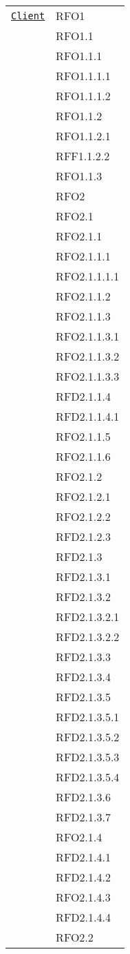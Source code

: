 \begin{longtable}{|>{\centering}m{10cm}|m{3cm}<{\centering}|}
\hyperref[Client]{\texttt{Client}} & RFO1\\
& RFO1.1\\
& RFO1.1.1\\
& RFO1.1.1.1\\
& RFO1.1.1.2\\
& RFO1.1.2\\
& RFO1.1.2.1\\
& RFF1.1.2.2\\
& RFO1.1.3\\
& RFO2\\
& RFO2.1\\
& RFO2.1.1\\
& RFO2.1.1.1\\
& RFO2.1.1.1.1\\
& RFO2.1.1.2\\
& RFO2.1.1.3\\
& RFO2.1.1.3.1\\
& RFO2.1.1.3.2\\
& RFO2.1.1.3.3\\
& RFD2.1.1.4\\
& RFD2.1.1.4.1\\
& RFO2.1.1.5\\
& RFO2.1.1.6\\
& RFO2.1.2\\
& RFO2.1.2.1\\
& RFO2.1.2.2\\
& RFD2.1.2.3\\
& RFD2.1.3\\
& RFD2.1.3.1\\
& RFD2.1.3.2\\
& RFD2.1.3.2.1\\
& RFD2.1.3.2.2\\
& RFD2.1.3.3\\
& RFD2.1.3.4\\
& RFD2.1.3.5\\
& RFD2.1.3.5.1\\
& RFD2.1.3.5.2\\
& RFD2.1.3.5.3\\
& RFD2.1.3.5.4\\
& RFD2.1.3.6\\
& RFD2.1.3.7\\
& RFO2.1.4\\
& RFD2.1.4.1\\
& RFD2.1.4.2\\
& RFO2.1.4.3\\
& RFD2.1.4.4\\
& RFO2.2\\

\end{longtable}
